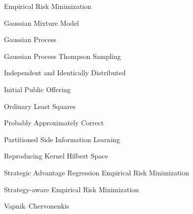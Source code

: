 \cleardoublepage
{}  %
\hypersetup{pageanchor=true}
\begin{abstract}

\end{abstract}

\setcounter{tocdepth}{2}
\cleardoublepage{}
{}
\tableofcontents
\listoftables
\listoffigures
\cleardoublepage{}
{}
\listofalgorithms



\begin{listofabbrevations}
\begin{description}
\item{} \quad Empirical Risk Minimization
\item{} \quad Gaussian Mixture Model
\item{} \quad Gaussian Process
\item{} \quad Gaussian Process Thompson Sampling
\item{} \quad Independent and Identically Distributed
\item{} \quad Initial Public Offering
\item{} \quad Ordinary Least Squares
\item{} \quad Probably Approximately Correct
\item{} \quad Partitioned Side Information Learning
\item{} \quad Reproducing Kernel Hilbert Space
\item{} \quad Strategic Advantage Regression Empirical Risk Minimization
\item{} \quad Strategy-aware Empirical Risk Minimization
\item{} \quad Vapnik--Chervonenkis
\end{description}
\end{listofabbrevations}

\cleardoublepage{} %